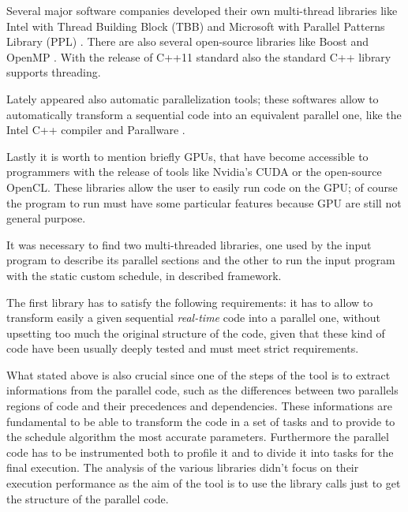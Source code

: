 \documentclass[a4paper,11pt,oneside]{book}
\begin{document}
Several major software companies developed their own multi-thread libraries like Intel with Thread Building Block (TBB) \cite{tbb} and Microsoft with Parallel Patterns Library (PPL) \cite{ppl}. There are also several open-source libraries like Boost \cite{boost} and OpenMP \cite{openmp}. With the release of C++11 standard also the standard C++ library supports threading.

Lately appeared also automatic parallelization tools; these softwares allow to automatically transform a sequential code into an equivalent parallel one, like the Intel C++ compiler \cite{icc} and Parallware \cite{parallware}.  

Lastly it is worth to mention briefly GPUs, that have become accessible to programmers with the release of tools like Nvidia's CUDA or the open-source OpenCL. These libraries allow the user to easily run code on the GPU; of course the program to run must have some particular features because GPU are still not general purpose. 

It was necessary to find two multi-threaded libraries, one used by the input program to describe its parallel sections and the other to run the input program with the static custom schedule, in described framework.

The first library has to satisfy the following requirements: it has to allow to transform easily a given sequential \emph{real-time} code into a parallel one, without upsetting too much the original structure of the code, given that these kind of code have been usually deeply tested and must meet strict requirements.

What stated above is also crucial since one of the steps of the tool is to extract informations from the parallel code, such as the differences between two parallels regions of code and their precedences and dependencies. These informations are fundamental to be able to transform the code in a set of tasks and to provide to the schedule algorithm the most accurate parameters. Furthermore the parallel code has to be instrumented both to profile it and to divide it into tasks for the final execution. The analysis of the various libraries didn’t focus on their execution performance as the aim of the tool is to use the library calls just to get the structure of the parallel code.
\end{document}
